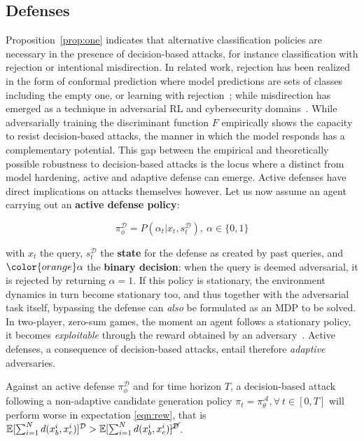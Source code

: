 \subsection{Defenses}

Proposition~\ref{prop:one} indicates that alternative classification policies are necessary in the presence of decision-based attacks, for instance classification with rejection or intentional misdirection.
In related work, rejection has been realized in the form of conformal prediction where model predictions are sets of classes including the empty one, or learning with rejection~\cite{barbero2022transcending, cortes2016learning}; while misdirection has emerged as a technique in adversarial RL and cybersecurity domains~\cite{gleave2020adversarial, sengupta2020multi}.
While adversarially training the discriminant function $F$ empirically shows the capacity to resist decision-based attacks, the manner in which the model responds has a complementary potential.
This gap between the empirical and theoretically possible robustness to decision-based attacks is the locus where a distinct from model hardening, active and adaptive defense can emerge.
Active defenses have direct implications on attacks themselves however.
Let us now assume an agent carrying out an \textbf{active defense policy}:

\begin{equation}
\pi_\phi^{\mathcal{D}} = P(\alpha_t|x_t,s^{\mathcal{D}}_t), \: \alpha \in \{0,1\}
\label{eqn:def}
\end{equation}

\noindent with $x_t$ the query, $s^{\mathcal{D}}_t$ the \textbf{state} for the defense as created by past queries, and $\color{orange}\alpha$ the \textbf{binary decision}: when the query is deemed adversarial, it is rejected by returning $\alpha=1$.
If this policy is stationary, the environment dynamics in turn become stationary too, and thus together with the adversarial task itself, bypassing the defense can \emph{also} be formulated as an MDP to be solved.
In two-player, zero-sum games, the moment an agent follows a stationary policy, it becomes \textit{exploitable} through the reward obtained by an adversary~\cite{timbers2022approximate}.
Active defenses, a consequence of decision-based attacks, entail therefore \textit{adaptive} adversaries.

\begin{proposition}
Against an active defense $\pi_\phi^{\mathcal{D}}$ and for time horizon $T$, a decision-based attack following a non-adaptive candidate generation policy $\pi_t = \pi_\theta^\mathcal{A}, \forall \: t \in [0,T]$ will perform worse in expectation \eqref{eqn:rew}, that is $\mathbb{E}[\sum_{i=1}^{N}d(x^i_b,x^i_c)]^{\mathcal{D}} > \mathbb{E}[\sum_{i=1}^{N}d(x^i_b,x^i_c)]^{\cancel{\mathcal{D}}}$.
\label{prop:two}
\end{proposition}

